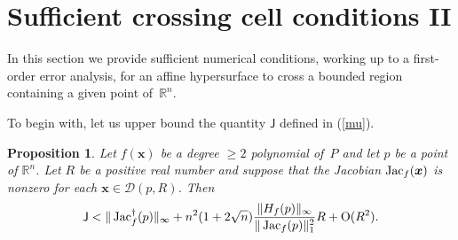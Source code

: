 \documentclass[10pt]{article}
\newcommand{\x}{{\bm x}}
\newcommand\R{{\mathbb R}}
\def\Jac{\mathop{\rm Jac}\nolimits}
\newtheorem{prop}[theorem]{Proposition}
\begin{document}
\section{Sufficient crossing cell conditions II}\label{passaggioCella2bis}
\addtocounter{subsection}{1}\setcounter{theorem}{0}
In this section we provide sufficient  numerical conditions, working up to a first-order error analysis,  for 
 an affine hypersurface  to cross
 a bounded region containing a given point  of~$\R^n$.  

To begin with, let us  upper bound the quantity $\mathsf J$ defined in  (\ref{mu}).

\begin{prop}\label{1Luglio}
Let $f(\x)$ be a  degree $\geq 2$   polynomial of~$P$ and 
let $p$ be a point of $\R^n$. Let $R$ be a positive real number and 
suppose that the Jacobian $\Jac_f(\x)$ is nonzero for each 
$\x \in \mathcal D(p,R)$. Then 
$$
\mathsf J <  
 \|\Jac_f^\dagger(p)\|_\infty+  n^2(1+2 \sqrt{n}) \frac{ \|H_f(p)\|_\infty}{\|\Jac_f(p)\|_1^2} R +{\rm O}(R^2).
$$
\end{prop}
\end{document}
